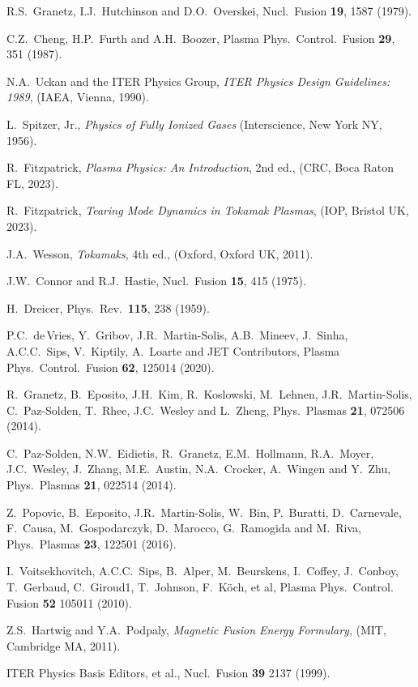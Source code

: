 \documentclass[12pt,prb,aps]{revtex4-1}
\begin{document}
\begin{thebibliography}{99}
 R.S.~Granetz, I.J.~Hutchinson and D.O.~Overskei, Nucl.\ Fusion {\bf 19}, 1587 (1979).

 C.Z.~Cheng, H.P.~Furth and A.H.~Boozer, Plasma Phys.\ Control.\ Fusion {\bf 29}, 351 (1987).

 N.A.~Uckan and the ITER Physics Group, {\em ITER Physics Design Guidelines: 1989},  (IAEA, Vienna, 1990).

 L.~Spitzer, Jr., {\em Physics of Fully Ionized Gases}\/ (Interscience, New York NY, 1956).

 R.~Fitzpatrick, {\em Plasma Physics: An Introduction}, 2nd ed., (CRC, Boca Raton FL, 2023).

 R.~Fitzpatrick, {\em Tearing Mode Dynamics in Tokamak Plasmas}, (IOP, Bristol UK, 2023).

 J.A.~Wesson, {\em Tokamaks}, 4th ed., (Oxford, Oxford UK, 2011).

 J.W.~Connor and R.J.~Hastie, Nucl.\ Fusion {\bf 15}, 415 (1975).

 H.~Dreicer, Phys.\ Rev.\ {\bf 115}, 238 (1959).

 P.C.~de\,Vries, Y.~Gribov, J.R.~Martin-Solis, A.B.~Mineev, J.~Sinha, A.C.C.~Sips, V.~Kiptily, A.~Loarte and JET Contributors, Plasma Phys.\ Control.\ Fusion
{\bf 62}, 125014 (2020). 

 R.~Granetz, B.~Eposito, J.H.~Kim, R.~Koslowski, M.~Lehnen, J.R.~Martin-Solis, C.~Paz-Solden, T.~Rhee, J.C.~Wesley
and L.~Zheng, Phys.\ Plasmas {\bf 21}, 072506 (2014).

 C.~Paz-Solden,  N.W.~Eidietis,  R.~Granetz, E.M.~Hollmann, R.A.~Moyer, J.C.~Wesley, J.~Zhang, M.E.~Austin, N.A.~Crocker, A.~Wingen and Y.~Zhu, 
 Phys.\ Plasmas {\bf 21}, 022514 (2014).

 Z.~Popovic, B.~Esposito, J.R.~Martin-Solis, W.~Bin,  P.~Buratti, D.~Carnevale, F.~Causa, M.~Gospodarczyk,
D.~Marocco, G.~Ramogida and M.~Riva, Phys.\ Plasmas {\bf 23}, 122501 (2016). 

 I.~Voitsekhovitch, A.C.C.~Sips, B.~Alper, M.~Beurskens, I.~Coffey,
J.~Conboy, T.~Gerbaud, C.~Giroud1, T.~Johnson, F.~K\"{o}ch, et al, Plasma Phys.\ Control. Fusion {\bf 52}  105011 (2010). 

 Z.S.~Hartwig and Y.A.~Podpaly, {\em Magnetic Fusion Energy Formulary}, (MIT, Cambridge MA, 2011).
 
 ITER Physics Basis Editors, et al., Nucl.\ Fusion {\bf 39} 2137 (1999). 
 
\end{thebibliography}
\end{document}
